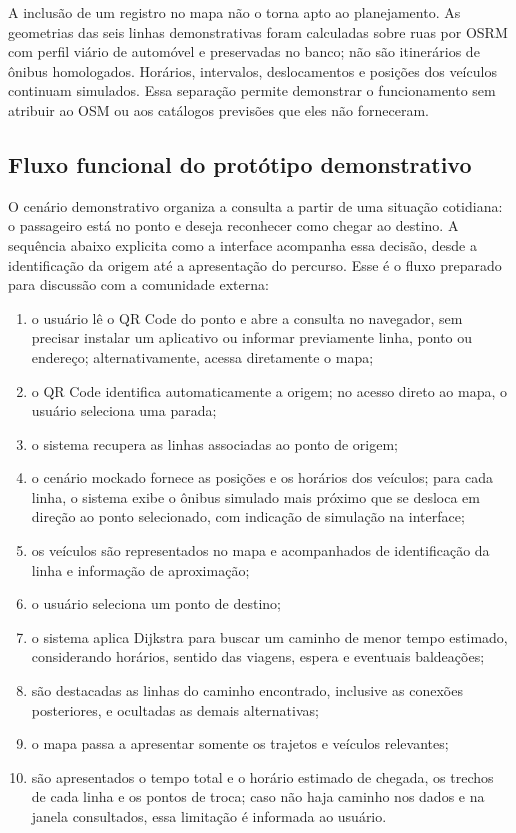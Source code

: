 \documentclass[12pt,oneside,a4paper,brazil]{abntex2}
\begin{document}
A inclusão de um registro no mapa não o torna apto ao planejamento. As geometrias das seis linhas demonstrativas foram calculadas sobre ruas por OSRM com perfil viário de automóvel e preservadas no banco; não são itinerários de ônibus homologados. Horários, intervalos, deslocamentos e posições dos veículos continuam simulados. Essa separação permite demonstrar o funcionamento sem atribuir ao OSM ou aos catálogos previsões que eles não forneceram.

\subsection{Fluxo funcional do protótipo demonstrativo}

O cenário demonstrativo organiza a consulta a partir de uma situação cotidiana: o passageiro está no ponto e deseja reconhecer como chegar ao destino. A sequência abaixo explicita como a interface acompanha essa decisão, desde a identificação da origem até a apresentação do percurso. Esse é o fluxo preparado para discussão com a comunidade externa:

\begin{enumerate}
\item o usuário lê o QR Code do ponto e abre a consulta no navegador, sem precisar instalar um aplicativo ou informar previamente linha, ponto ou endereço; alternativamente, acessa diretamente o mapa;
\item o QR Code identifica automaticamente a origem; no acesso direto ao mapa, o usuário seleciona uma parada;
\item o sistema recupera as linhas associadas ao ponto de origem;
\item o cenário mockado fornece as posições e os horários dos veículos; para cada linha, o sistema exibe o ônibus simulado mais próximo que se desloca em direção ao ponto selecionado, com indicação de simulação na interface;
\item os veículos são representados no mapa e acompanhados de identificação da linha e informação de aproximação;
\item o usuário seleciona um ponto de destino;
\item o sistema aplica Dijkstra para buscar um caminho de menor tempo estimado, considerando horários, sentido das viagens, espera e eventuais baldeações;
\item são destacadas as linhas do caminho encontrado, inclusive as conexões posteriores, e ocultadas as demais alternativas;
\item o mapa passa a apresentar somente os trajetos e veículos relevantes;
\item são apresentados o tempo total e o horário estimado de chegada, os trechos de cada linha e os pontos de troca; caso não haja caminho nos dados e na janela consultados, essa limitação é informada ao usuário.
\end{enumerate}
\end{document}
